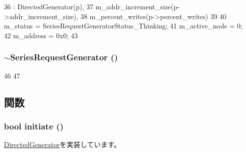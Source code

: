 \begin{DoxyCode}
36     : DirectedGenerator(p),
37       m_addr_increment_size(p->addr_increment_size),
38       m_percent_writes(p->percent_writes)
39 {
40     m_status = SeriesRequestGeneratorStatus_Thinking;
41     m_active_node = 0;
42     m_address = 0x0;
43 }
\end{DoxyCode}
\hypertarget{classSeriesRequestGenerator_a1bcc0454580e7ed7665c3a514ea0d77b}{
\subsubsection[{$\sim$SeriesRequestGenerator}]{\setlength{\rightskip}{0pt plus 5cm}$\sim${\bf SeriesRequestGenerator} ()}}
\label{classSeriesRequestGenerator_a1bcc0454580e7ed7665c3a514ea0d77b}



\begin{DoxyCode}
46 {
47 }
\end{DoxyCode}


\subsection{関数}
\hypertarget{classSeriesRequestGenerator_a4f5ee6a9e0c2962dfc0b4bb1978e6d28}{
\subsubsection[{initiate}]{\setlength{\rightskip}{0pt plus 5cm}bool initiate ()}}
\label{classSeriesRequestGenerator_a4f5ee6a9e0c2962dfc0b4bb1978e6d28}


\hyperlink{classDirectedGenerator_a1c6f0032904b7bd7035a5cb7c88a8354}{DirectedGenerator}を実装しています。


